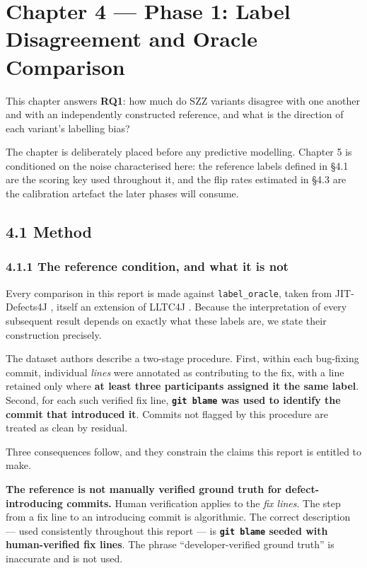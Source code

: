 \chapter{Chapter 4 --- Phase 1: Label Disagreement and Oracle
Comparison}\label{chapter-4-phase-1-label-disagreement-and-oracle-comparison}

This chapter answers \textbf{RQ1}: how much do SZZ variants disagree
with one another and with an independently constructed reference, and
what is the direction of each variant's labelling bias?

The chapter is deliberately placed before any predictive modelling.
Chapter 5 is conditioned on the noise characterised here: the reference
labels defined in \S{}4.1 are the scoring key used throughout it, and the
flip rates estimated in \S{}4.3 are the calibration artefact the later
phases will consume.

\section{4.1 Method}\label{method}

\subsection{4.1.1 The reference condition, and what it is
not}\label{the-reference-condition-and-what-it-is-not}

Every comparison in this report is made against \texttt{label\_oracle},
taken from JIT-Defects4J \citep{ni2022jitdefects4j}, itself an extension
of LLTC4J \citep{herbold2022tangling}. Because the interpretation of
every subsequent result depends on exactly what these labels are, we
state their construction precisely.

The dataset authors describe a two-stage procedure. First, within each
bug-fixing commit, individual \emph{lines} were annotated as
contributing to the fix, with a line retained only where \textbf{at
least three participants assigned it the same label}. Second, for each
such verified fix line, \textbf{\texttt{git\ blame} was used to identify
the commit that introduced it}. Commits not flagged by this procedure
are treated as clean by residual.

Three consequences follow, and they constrain the claims this report is
entitled to make.

\textbf{The reference is not manually verified ground truth for
defect-introducing commits.} Human verification applies to the \emph{fix
lines}. The step from a fix line to an introducing commit is
algorithmic. The correct description --- used consistently throughout
this report --- is \textbf{\texttt{git\ blame} seeded with
human-verified fix lines}. The phrase ``developer-verified ground
truth'' is inaccurate and is not used.


